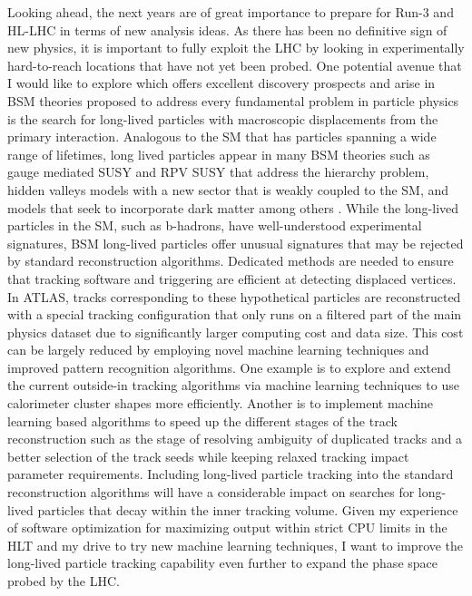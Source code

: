 \documentclass[a4paper]{article}
\begin{document}
\bigskip

Looking ahead, the next years are of great importance to prepare for Run-3 and HL-LHC in terms of new analysis ideas. As there has been no definitive sign of new physics, it is important to fully exploit the LHC by looking in experimentally hard-to-reach locations that have not yet been probed. One potential avenue that I would like to explore which offers excellent discovery prospects and arise in BSM theories proposed to address every fundamental problem in particle physics is the search for long-lived particles with macroscopic displacements from the primary interaction. Analogous to the SM that has particles spanning a wide range of lifetimes, long lived particles appear in many BSM theories such as gauge mediated SUSY and RPV SUSY that address the hierarchy problem, hidden valleys models with a new sector that is weakly coupled to the SM, and models that seek to incorporate dark matter among others \cite{alimena2019searching}. While the long-lived particles in the SM, such as b-hadrons, have well-understood experimental signatures, BSM long-lived particles offer unusual signatures that may be rejected by standard reconstruction algorithms. Dedicated methods are needed to ensure that tracking software and triggering are efficient at detecting displaced vertices. In ATLAS, tracks corresponding to these hypothetical particles are reconstructed with a special tracking configuration that only runs on a filtered part of the main physics dataset due to significantly larger computing cost and data size. This cost can be largely reduced by employing novel machine learning techniques and improved pattern recognition algorithms. One example is to explore and extend the current outside-in tracking algorithms via machine learning techniques to use calorimeter cluster shapes more efficiently. Another is to implement machine learning based algorithms to speed up the different stages of the track reconstruction such as the stage of resolving ambiguity of duplicated tracks and a  better selection of the track seeds while keeping relaxed tracking impact parameter requirements. Including long-lived particle tracking into the standard reconstruction algorithms will have a considerable impact on searches for long-lived particles that decay within the inner tracking volume. Given my experience of software optimization for maximizing output within strict CPU limits in the HLT and my drive to try new machine learning techniques, I want to improve the long-lived particle tracking capability even further to expand the phase space probed by the LHC.
\end{document}
